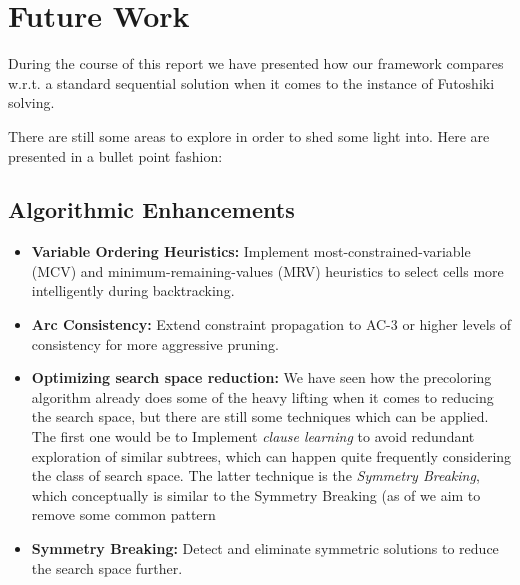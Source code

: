 \section{Future Work}
\label{sec:future_work}
During the course of this report we have presented how our framework compares w.r.t. a standard sequential solution when it comes to the instance of Futoshiki solving. 

There are still some areas to explore in order to shed some light into. Here are presented in a bullet point fashion:

\subsection{Algorithmic Enhancements}
\begin{itemize}
    \item \textbf{Variable Ordering Heuristics:} Implement most-constrained-variable (MCV) and minimum-remaining-values (MRV) heuristics to select cells more intelligently during backtracking.
    
    \item \textbf{Arc Consistency:} Extend constraint propagation to AC-3 or higher levels of consistency for more aggressive pruning.
    
    \item \textbf{Optimizing search space reduction:} We have seen how the precoloring algorithm already does some of the heavy lifting when it comes to reducing the search space, but there are still some techniques which can be applied. The first one would be to  Implement \textit{clause learning} to avoid redundant exploration of similar subtrees, which can happen quite frequently considering the class of search space. The latter technique is the \textit{Symmetry Breaking}, which conceptually is similar to the Symmetry Breaking (as of we aim to remove some common pattern
    
    \item \textbf{Symmetry Breaking:} Detect and eliminate symmetric solutions to reduce the search space further.
\end{itemize}

